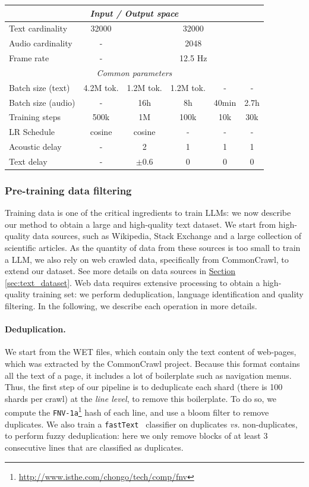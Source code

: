 \begin{table}[t]
{\begin{tabular}{l|c|cccc}
    \multicolumn{6}{c}{\textit{Input / Output space}} \\
    \midrule[0.3pt]
    Text cardinality & 32000 & \multicolumn{4}{c}{32000}\\
    Audio cardinality & - & \multicolumn{4}{c}{2048}\\
    Frame rate & - & \multicolumn{4}{c}{12.5 Hz} \\
    \midrule
    \multicolumn{6}{c}{\textit{Common parameters}} \\
    \midrule[0.3pt]
    Batch size (text)    & 4.2M tok. & 1.2M tok. & 1.2M tok. &  - & - \\
    Batch size (audio)   & - & 16h & 8h & 40min & 2.7h\\
    Training steps       & 500k & 1M & 100k & 10k & 30k \\
    LR Schedule          & cosine & cosine & - & - & -\\
    Acoustic delay       & - & 2 & 1 & 1 & 1 \\
    Text delay           & - & $\pm$0.6 & 0 & 0 & 0 \\
    \bottomrule
  \end{tabular}}
\end{table}

\subsubsection{Pre-training data filtering}
\label{sec:data_filtering}
Training data is one of the critical ingredients to train LLMs: we now describe our method to obtain a large and high-quality text dataset.
We start from high-quality data sources, such as Wikipedia, Stack Exchange and a large collection of scientific articles.
As the quantity of data from these sources is too small to train a LLM, we also rely on web crawled data, specifically from CommonCrawl, to extend our dataset. See more details on data sources in \hyperref[sec:text_dataset]{Section \ref{sec:text_dataset}}. 
Web data requires extensive processing to obtain a high-quality training set: we perform deduplication, language identification and quality filtering.
In the following, we describe each operation in more details.

\paragraph{Deduplication.}
We start from the WET files, which contain only the text content of web-pages, which was extracted by the CommonCrawl project.
Because this format contains all the text of a page, it includes a lot of boilerplate such as navigation menus.
Thus, the first step of our pipeline is to deduplicate each shard (there is 100 shards per crawl) at the \emph{line level}, to remove this boilerplate.
To do so, we compute the \texttt{FNV-1a}\footnote{\url{http://www.isthe.com/chongo/tech/comp/fnv}} hash of each line, and use a bloom filter to remove duplicates.
We also train a \texttt{fastText}~\citep{joulin2016bag} classifier on duplicates \emph{vs.} non-duplicates, to perform fuzzy deduplication:
here we only remove blocks of at least 3 consecutive lines that are classified as duplicates.

